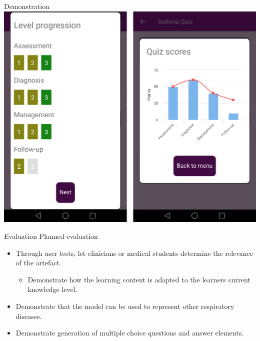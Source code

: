\documentclass{beamer}
\begin{document}
\begin{frame}{Demonstration}
\includegraphics[scale=0.16]{Montage6}
\end{frame}

\begin{frame}{Evaluation}
Planned evaluation
\begin{itemize}
	\item Through user tests, let clinicians or medical students determine the relevance of the artefact.
	\begin{itemize}
		\item Demonstrate how the learning content is adapted to the learners current knowledge level.
	\end{itemize}
	\item Demonstrate that the model can be used to represent other respiratory diseases.
	\item Demonstrate generation of multiple choice questions and answer elements.

\end{itemize}
\end{frame}
\end{document}
